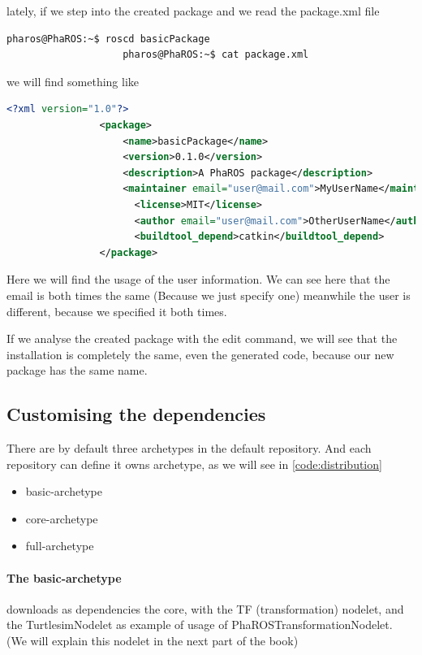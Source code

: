 \documentclass[a4paper,10pt,twoside]{book}
\begin{document}
				lately, if we step into the created package and we read the package.xml file
				\begin{lstlisting}[language=bash,title={ roscd - cat}]
					pharos@PhaROS:~$ roscd basicPackage
					pharos@PhaROS:~$ cat package.xml
				\end{lstlisting} 
				
				we will find something like 
				
				\begin{lstlisting}[language=xml,title={ package.xml }]
				<?xml version="1.0"?>
				<package>
				  	<name>basicPackage</name>
				  	<version>0.1.0</version>
				  	<description>A PhaROS package</description>
				  	<maintainer email="user@mail.com">MyUserName</maintainer>
					  <license>MIT</license>
					  <author email="user@mail.com">OtherUserName</author> 
					  <buildtool_depend>catkin</buildtool_depend>
				</package>
				\end{lstlisting} 
				
	
				Here we will find the usage of the user information. We can see here that the email is both times the same (Because we just specify one) meanwhile the user is different, because we specified it both times.
				
				
				If we analyse the created package with the edit command, we will see that the installation is completely the same, even the generated code, because our new package has the same name.
				
				
				
				\subsection{Customising the dependencies}
				
				
				There are by default three archetypes in the default repository. And each repository can define it owns archetype, as we will see in \autoref{code:distribution} 
				
				\begin{itemize}
					\item basic-archetype
					\item core-archetype
					\item full-archetype
				\end{itemize}
				
				
				\paragraph{The basic-archetype} downloads as dependencies the \fwkName{} core, with the TF (transformation) nodelet, and the TurtlesimNodelet as example of usage of PhaROSTransformationNodelet. (We will explain this nodelet in the next part of the book) 
				
\end{document}
